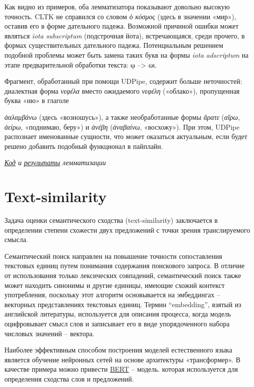 \documentclass[
  letterpaper,
]{book}
\begin{document}
Как видно из примеров, оба лемматизатора показывают довольно высокую
точность. CLTK не справился со словом \emph{ὁ κόσμος} (здесь в значении
«мир»), оставив его в форме дательного падежа. Возможной причиной ошибки
может являться \emph{iota subscriptum} (подстрочная йота),
встречающаяся, среди прочего, в формах существительных дательного
падежа. Потенциальным решением подобной проблемы может быть замена таких
букв на формы \emph{iota adscriptum} на этапе предварительной обработки
текста: ῳ --\textgreater{} ωι.

Фрагмент, обработанный при помощи UDPipe, содержит больше неточностей:
диалектная форма \emph{νεφέλα} вместо ожидаемого \emph{νεφέλη}
(«облако»), пропущенная буква «ню» в глаголе

\emph{ἀαλαμβάνω} (здесь «возношусь»), а также необработанные формы
\emph{ἄρατε} (\emph{αἴρω}, \emph{ἀείρω}, «поднимаю, беру») и
\emph{ἀνέβη} (\emph{ἀναβαίνω}, «восхожу»). При этом, UDPipe распознает
именованные сущности, что может оказаться актуальным, если будет решено
добавить подобный функционал в пайплайн.

\emph{\href{https://github.com/Drozhzhinastya/GSPC/tree/main/scripts/lemmatization}{Код}
и
\href{https://github.com/Drozhzhinastya/GSPC/tree/main/lemmatization/greek}{результаты}
лемматизации}


\hypertarget{text-similarity}{%
\chapter{Text-similarity}\label{text-similarity}}

Задача оценки семантического сходства (text-similarity) заключается в
определении степени схожести двух предложений с точки зрения
транслируемого смысла.

Семантический поиск направлен на повышение точности сопоставления
текстовых единиц путем понимания содержания поискового запроса. В
отличие от использования только лексических совпадений, семантический
поиск также может находить синонимы и другие единицы, имеющие схожий
контекст употребления, поскольку этот алгоритм основывается на
эмбеддингах -- векторных представлениях текстовых единиц. Термин
``embedding'', взятый из английской литературы, используется для
описания процесса, когда модель оцифровывает смысл слов и записывает его
в виде упорядоченного набора числовых значений -- вектора.

Наиболее эффективным способом построения моделей естественного языка
является обучение нейронных сетей на основе архитектуры «трансформер». В
качестве примера можно привести
\href{https://arxiv.org/abs/1810.04805}{BERT} -- модель. которая
используется для определения сходства слов и предложений.
\end{document}
